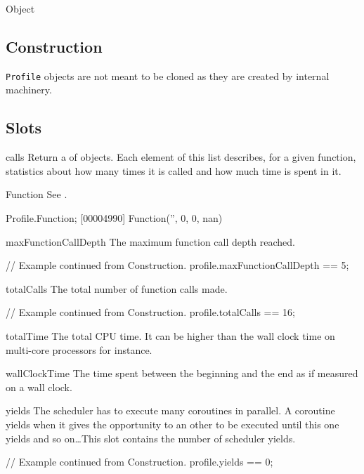 \begin{refObjects}
\item[Object]
\end{refObjects}

\subsection{Construction}

\lstinline|Profile| objects are not meant to be cloned as they are created
by  internal machinery.

\subsection{Slots}

\begin{urbiscriptapi}
\item[calls]%
  Return a  of  objects. Each
  element of this list describes, for a given function, statistics about how
  many times it is called and how much time is spent in it.


\item[Function]
  See .
\begin{urbiscript}
Profile.Function;
[00004990] Function('', 0, 0, nan)
\end{urbiscript}


\item[maxFunctionCallDepth]%
  The maximum function call depth reached.
\begin{urbiassert}
// Example continued from Construction.
profile.maxFunctionCallDepth == 5;
\end{urbiassert}


\item[totalCalls]%
  The total number of function calls made.
\begin{urbiassert}
// Example continued from Construction.
profile.totalCalls == 16;
\end{urbiassert}


\item[totalTime]%
  The total CPU time. It can be higher than the wall clock time on
  multi-core processors for instance.


\item[wallClockTime]%
  The time spent between the beginning and the end as if measured on a wall
  clock.


\item[yields]%
  The scheduler has to execute many coroutines in parallel. A coroutine
  yields when it gives the opportunity to an other to be executed until this
  one yields and so on\dots This slot contains the number of scheduler
  yields.
\begin{urbiassert}
// Example continued from Construction.
profile.yields == 0;
\end{urbiassert}
\end{urbiscriptapi}


